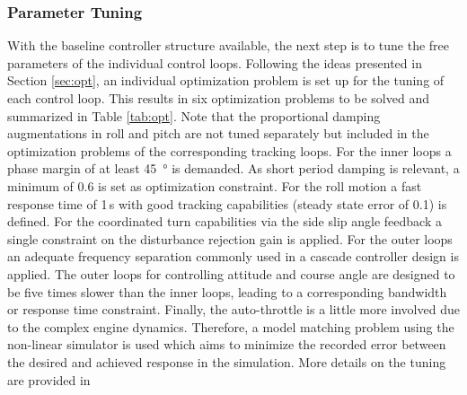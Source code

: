 \documentclass[aerospace,article,submit,moreauthors,pdftex,10pt,a4paper]{Definitions/mdpi}
\begin{document}
\subsubsection{Parameter Tuning}
With the baseline controller structure available, the next step is to tune the free parameters of the individual control loops. Following the  ideas presented in Section \ref{sec:opt}, an individual  optimization problem is set up for the tuning of each control loop. This results in six  optimization problems to be solved and summarized in Table \ref{tab:opt}. Note that the proportional damping augmentations in roll and pitch are not tuned separately but included in the optimization problems of the corresponding tracking loops. For the inner loops a phase margin of at least \SI{45}{\degree} is demanded. As short period damping is relevant, a minimum of 0.6 is set as optimization constraint. For the roll motion a fast response time of 1\,s with good tracking capabilities (steady state error of 0.1) is defined. For the coordinated turn capabilities  via the side slip angle feedback a single constraint on the disturbance rejection gain is applied. For the outer loops an adequate frequency separation commonly used in a cascade controller design is applied. The outer loops for controlling attitude and course angle are designed to be five times slower than the inner loops, leading to a corresponding bandwidth or response time constraint. Finally, the auto-throttle is a little more involved due to the complex engine dynamics. Therefore, a model matching problem using the non-linear simulator is used which aims to minimize the recorded error between the desired and achieved response in the simulation. More details on the tuning are provided in \cite{Ossmann19a}
\end{document}

